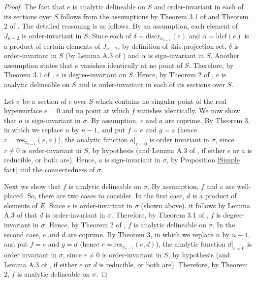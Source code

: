 \documentclass{article}
\begin{document}
\begin{proof}
    The fact that $e$ is analytic delineable on $S$ and order-invariant in
    each of its sections over $S$ follows from the assumptions
    by Theorem 3.1 of \cite{Brown2001} and Theorem 2 of 
    \cite{McCallum1998}. 
    The detailed reasoning is as follows.
    By an assumption, each element of $J_{n-2}$ is order-invariant 
    in $S$. Since each of $\delta = \mathrm{discr}_{x_{n-1}}(e)$ and
    $\alpha = \mathrm{ldcf}(e)$ is a product of certain elements
    of $J_{n-2}$,
    by definition of this projection set, $\delta$ is order-invariant
    in $S$ (by Lemma A.3 of \cite{McCallum1988})
    and $\alpha$ is sign-invariant in $S$.
    Another assumption states that 
    $e$ vanishes identically at no point of $S$.
    Therefore, by Theorem 3.1 of \cite{Brown2001}, $e$ is degree-invariant
    on $S$. Hence, by Theorem 2 of \cite{McCallum1998},
    $e$ is analytic delineable on $S$ and is order-invariant in
    each of its sections over $S$.
    
    Let $\sigma$ be a section of $e$ over $S$ which contains no singular
    point of the real hypersurface $e = 0$ and no point at which
    $f$ vanishes identically.
    We now show that $a$ is sign-invariant in $\sigma$.
    By assumption, $e$ and $a$ are coprime.
    By Theorem 3, in which we replace $n$ by $n-1$, and put
    $f = e$ and $g = a$ (hence $r = \mathrm{res}_{x_{n-1}}(e,a)$),
    the analytic function $a|_{e=0}$ is order invariant in $\sigma$,
    since $r \neq 0$ is order-invariant in $S$, by hypothesis
    (and Lemma A.3 of \cite{McCallum1988}, 
    if either $e$ or $a$ is reducible, or both are).
    Hence, $a$ is sign-invariant in $\sigma$, 
    by Proposition \ref{Simple fact} and the connectedness of $\sigma$.

    Next we show that $f$ is analytic delineable on $\sigma$.
    By assumption, $f$ and $e$ are well-placed.
    So, there are two cases to consider.
    In the first case, $d$ is a product of elements of $E$.
    Since $e$ is order-invariant in $\sigma$ (shown above),
    it follows by Lemma A.3 of \cite{McCallum1988} that
    $d$ is order-invariant in $\sigma$.
    Therefore, by Theorem 3.1 of \cite{Brown2001},
    $f$ is degree-invariant in $\sigma$.
    Hence, by Theorem 2 of \cite{McCallum1998},
    $f$ is analytic delineable on $\sigma$.
    In the second case, $e$ and $d$ are coprime.
    By Theorem 3, in which we replace $n$ by $n-1$,
    and put $f = e$ and $g = d$ (hence $r = \mathrm{res}_{x_{n-1}}(e,d)$),
    the analytic function $d|_{e=0}$ is order invariant in $\sigma$,
    since $r \neq 0$ is order-invariant in $S$, by hypothesis
    (and Lemma A.3 of \cite{McCallum1988}, if 
    either $e$ or $d$ is reducible, or both are).
    Therefore, by Theorem 2, $f$ is analytic delineable on $\sigma$.


\end{proof}
\end{document}
